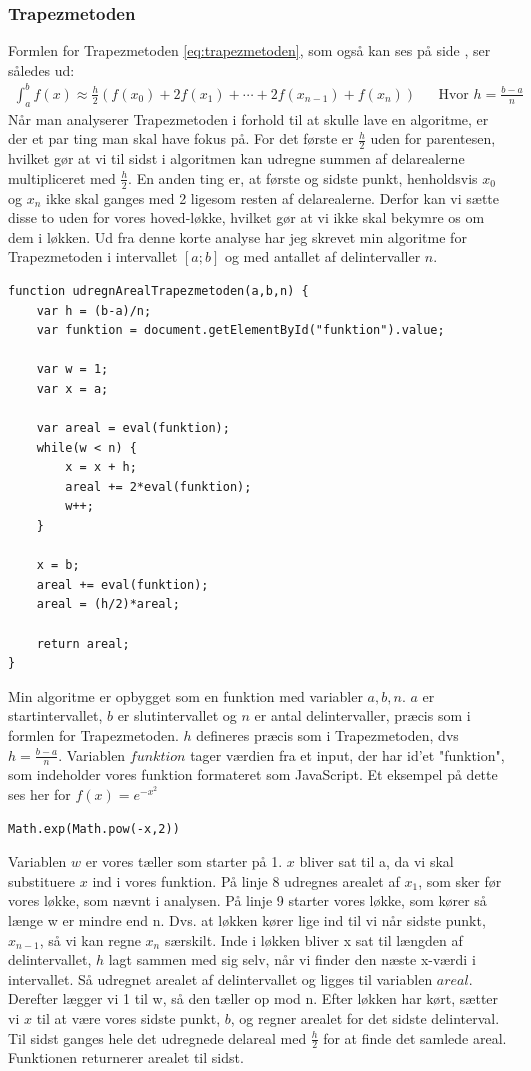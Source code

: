 \documentclass[12pt]{article}
\numberwithin{equation}{section}
\begin{document}
\subsubsection{Trapezmetoden}
Formlen for Trapezmetoden \eqref{eq:trapezmetoden}, som også kan ses på side \pageref{eq:trapezmetoden}, ser således ud:
\begin{align}
\int_{a}^{b}f(x) \approx \frac{h}{2}(f(x_0) + 2f(x_1) + \cdots + 2f(x_{n-1}) + f(x_n)) &&\text{Hvor } h=\frac{b-a}{n} \nonumber
\end{align}
Når man analyserer Trapezmetoden i forhold til at skulle lave en algoritme, er der et par ting man skal have fokus på. For det første er $\frac{h}{2}$ uden for parentesen, hvilket gør at vi til sidst i algoritmen kan udregne summen af delarealerne multipliceret med $\frac{h}{2}$. En anden ting er, at første og sidste punkt, henholdsvis $x_0$ og $x_n$ ikke skal ganges med 2 ligesom resten af delarealerne. Derfor kan vi sætte disse to uden for vores hoved-løkke, hvilket gør at vi ikke skal bekymre os om dem i løkken.
Ud fra denne korte analyse har jeg skrevet min algoritme for Trapezmetoden i intervallet $[a;b]$ og med antallet af delintervaller $n$.
\begin{lstlisting}[caption="udregnArealTrapezmetoden()"]
function udregnArealTrapezmetoden(a,b,n) {
	var h = (b-a)/n;
	var funktion = document.getElementById("funktion").value;
	
	var w = 1;
	var x = a;
	
	var areal = eval(funktion);
	while(w < n) {
		x = x + h;
		areal += 2*eval(funktion);
		w++;
	}
		
	x = b;
	areal += eval(funktion);
	areal = (h/2)*areal;
		
	return areal;
}
\end{lstlisting}

Min algoritme er opbygget som en funktion med variabler $a,b,n$. $a$ er startintervallet, $b$ er slutintervallet og $n$ er antal delintervaller, præcis som i formlen for Trapezmetoden. $h$ defineres præcis som i Trapezmetoden, dvs $h=\frac{b-a}{n}$. Variablen $funktion$ tager værdien fra et input, der har id'et "funktion", som indeholder vores funktion formateret som JavaScript. Et eksempel på dette ses her for $f(x) = e^{-x^2}$
\begin{lstlisting}
Math.exp(Math.pow(-x,2))
\end{lstlisting}
Variablen $w$ er vores tæller som starter på 1. $x$ bliver sat til a, da vi skal substituere $x$ ind i vores funktion. På linje 8 udregnes arealet af $x_1$, som sker før vores løkke, som nævnt i analysen. På linje 9 starter vores løkke, som kører så længe w er mindre end n. Dvs. at løkken kører lige ind til vi når sidste punkt, $x_{n-1}$, så vi kan regne $x_n$ særskilt. Inde i løkken bliver x sat til længden af delintervallet, $h$ lagt sammen med sig selv, når vi finder den næste x-værdi i intervallet. Så udregnet arealet af delintervallet og ligges til variablen $areal$. Derefter lægger vi 1 til w, så den tæller op mod n.
Efter løkken har kørt, sætter vi $x$ til at være vores sidste punkt, $b$, og regner arealet for det sidste delinterval. Til sidst ganges hele det udregnede delareal med $\frac{h}{2}$ for at finde det samlede areal. Funktionen returnerer arealet til sidst.
\end{document}

